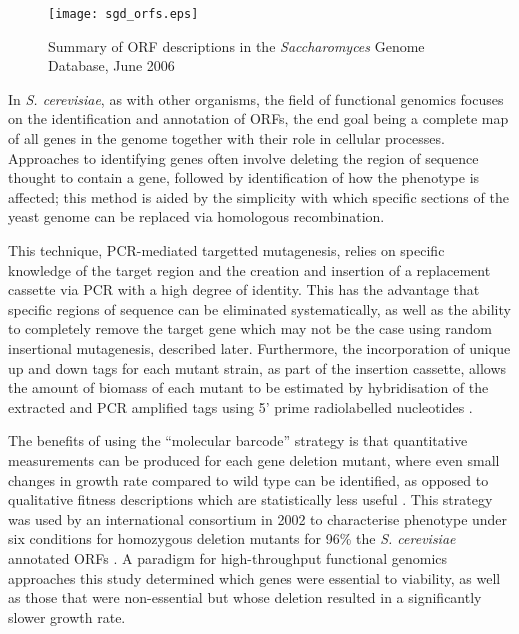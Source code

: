\begin{figure}
\centering
\texttt{[image: sgd\_orfs.eps]}
\caption[ORF descriptions in the \emph{Saccharomyces} Genome Database]{Summary of ORF descriptions in the \emph{Saccharomyces} Genome Database, June 2006}
\label{figure:orf_totals}
\end{figure}

In \emph{S. cerevisiae}, as with other organisms, the field of functional genomics focuses on the identification and annotation of ORFs, the end goal being a complete map of all genes in the genome together with their role in cellular processes. Approaches to identifying genes often involve deleting the region of sequence thought to contain a gene, followed by identification of how the phenotype is affected; this method is aided by the simplicity with which specific sections of the yeast genome can be replaced via homologous recombination.

This technique, PCR-mediated targetted mutagenesis, relies on specific knowledge of the target region and the creation and insertion of a replacement cassette via PCR with a high degree of identity. This has the advantage that specific regions of sequence can be eliminated systematically, as well as the ability to completely remove the target gene which may not be the case using random insertional mutagenesis, described later. Furthermore, the incorporation of unique up and down tags for each mutant strain, as part of the insertion cassette, allows the amount of biomass of each mutant to be estimated by hybridisation of the extracted and PCR amplified tags using 5' prime radiolabelled nucleotides \cite{giaever1999,delneri2004,wach1996,wach1994}.

The benefits of using the ``molecular barcode'' strategy is that quantitative measurements can be produced for each gene deletion mutant, where even small changes in growth rate compared to wild type can be identified, as opposed to qualitative fitness descriptions which are statistically less useful \cite{oliver2002,winzeler1999}. This strategy was used by an international consortium in 2002 to characterise phenotype under six conditions for homozygous deletion mutants for 96\% the \emph{S. cerevisiae} annotated ORFs \cite{giaever2002}. A paradigm for high-throughput functional genomics approaches this study determined which genes were essential to viability, as well as those that were non-essential but whose deletion resulted in a significantly slower growth rate.

